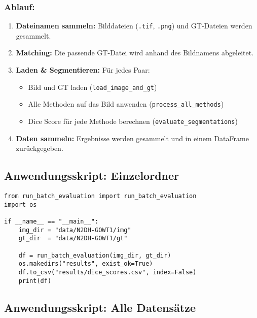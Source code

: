 \documentclass[a4paper,12pt]{article}
\begin{document}
\subsubsection*{Ablauf:}

\begin{enumerate}
  \item \textbf{Dateinamen sammeln:} Bilddateien (\texttt{.tif}, \texttt{.png}) und GT-Dateien werden gesammelt.
  \item \textbf{Matching:} Die passende GT-Datei wird anhand des Bildnamens abgeleitet.
  \item \textbf{Laden \& Segmentieren:} Für jedes Paar:
    \begin{itemize}
      \item Bild und GT laden (\texttt{load\_image\_and\_gt})
      \item Alle Methoden auf das Bild anwenden (\texttt{process\_all\_methods})
      \item Dice Score für jede Methode berechnen (\texttt{evaluate\_segmentations})
    \end{itemize}
  \item \textbf{Daten sammeln:} Ergebnisse werden gesammelt und in einem DataFrame zurückgegeben.
\end{enumerate}

\subsection*{ Anwendungsskript: Einzelordner}

\begin{verbatim}
from run_batch_evaluation import run_batch_evaluation
import os

if __name__ == "__main__":
    img_dir = "data/N2DH-GOWT1/img"
    gt_dir  = "data/N2DH-GOWT1/gt"

    df = run_batch_evaluation(img_dir, gt_dir)
    os.makedirs("results", exist_ok=True)
    df.to_csv("results/dice_scores.csv", index=False)
    print(df)
\end{verbatim}

\subsection*{ Anwendungsskript: Alle Datensätze}
\end{document}

